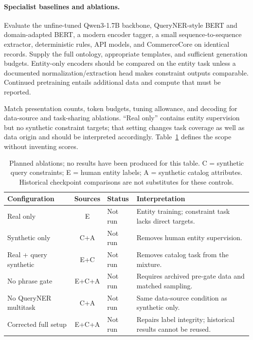 \paragraph{Specialist baselines and ablations.}
Evaluate the unfine-tuned Qwen3-1.7B backbone, QueryNER-style BERT and domain-adapted BERT, a modern encoder tagger, a small sequence-to-sequence extractor, deterministic rules, API models, and CommerceCore on identical records. Supply the full ontology, appropriate templates, and sufficient generation budgets. Entity-only encoders should be compared on the entity task unless a documented normalization/extraction head makes constraint outputs comparable. Continued pretraining entails additional data and compute that must be reported.

Match presentation counts, token budgets, tuning allowance, and decoding for data-source and task-sharing ablations. ``Real only'' contains entity supervision but no synthetic constraint targets; that setting changes task coverage as well as data origin and should be interpreted accordingly. Table~\ref{tab:ablationplan} defines the scope without inventing scores.

\begin{table}[h]
\centering\small
\caption{Planned ablations; no results have been produced for this table. C = synthetic query constraints; E = human entity labels; A = synthetic catalog attributes. Historical checkpoint comparisons are not substitutes for these controls.}
\label{tab:ablationplan}
\begin{tabularx}{\linewidth}{@{}lclX@{}}
\toprule
Configuration & Sources & Status & Interpretation \\
\midrule
Real only & E & Not run & Entity training; constraint task lacks direct targets. \\
Synthetic only & C+A & Not run & Removes human entity supervision. \\
Real + query synthetic & E+C & Not run & Removes catalog task from the mixture. \\
No phrase gate & E+C+A & Not run & Requires archived pre-gate data and matched sampling. \\
No QueryNER multitask & C+A & Not run & Same data-source condition as synthetic only. \\
Corrected full setup & E+C+A & Not run & Repairs label integrity; historical results cannot be reused. \\
\bottomrule
\end{tabularx}
\end{table}

